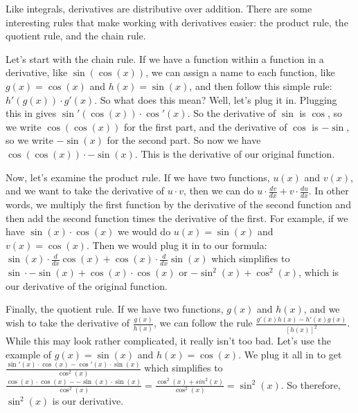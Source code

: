 Like integrals, derivatives are distributive over addition.
There are some interesting rules that make working with derivatives easier: the product rule, the quotient rule, and the chain rule. 

Let's start with the chain rule. 
If we have a function within a function in a derivative, like $\sin(\cos(x))$, we can assign a name to each function, like $g(x) = \cos(x)$ and $h(x) = \sin(x)$, and then follow this simple rule: $h'(g(x)) \cdot g'(x)$. 
So what does this mean? 
Well, let's plug it in. 
Plugging this in gives $\sin'(\cos(x)) \cdot \cos'(x)$. 
So the derivative of $\sin$ is $\cos$, so we write $\cos(\cos(x))$ for the first part, and the derivative of $\cos$ is $-\sin$, so we write $-\sin(x)$ for the second part. 
So now we have $\cos(\cos(x)) \cdot -\sin(x)$. 
This is the derivative of our original function.

Now, let's examine the product rule. 
If we have two functions, $u(x)$ and $v(x)$, and we want to take the derivative of $u\cdot v$, then we can do $u \cdot \frac{dv}{dx}+ v\cdot\frac{du}{dx}$. 
In other words, we multiply the first function by the derivative of the second function and then add the second function times the derivative of the first. 
For example, if we have $\sin(x)\cdot\cos(x)$ we would do $u(x) = \sin(x)$ and $v(x) = \cos(x)$. 
Then we would plug it in to our formula: $\sin(x)\cdot\frac{d}{dx}\cos(x) + \cos(x)\cdot\frac{d}{dx}\sin(x)$ which simplifies to $\sin\cdot -\sin(x) + \cos(x)\cdot\cos(x)$ or $-\sin^2(x)+\cos^2(x)$, which is our derivative of the original function.

Finally, the quotient rule. 
If we have two functions, $g(x)$ and $h(x)$, and we wish to take the derivative of $\frac{g(x)}{h(x)}$, we can follow the rule $\frac{g'(x)h(x)-h'(x)g(x)}{[h(x)]^2}$. 
While this may look rather complicated, it really isn't too bad. 
Let's use the example of $g(x) = \sin(x)$ and $h(x) = \cos(x)$. 
We plug it all in to get $\frac{\sin'(x)\cdot\cos(x) -\cos'(x)\cdot\sin(x)}{\cos^2(x)}$
which simplifies to $\frac{\cos(x)\cdot\cos(x)--\sin(x)\cdot\sin(x)}{\cos^2(x)} = \frac{\cos^2(x)+sin^2(x)}{\cos^2(x)} = \sin^2(x)$. 
So therefore, $\sin^2(x)$ is our derivative.
